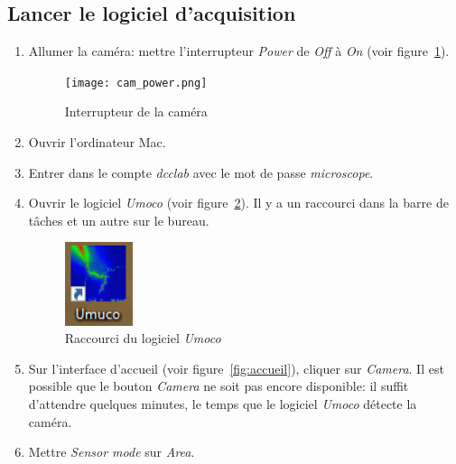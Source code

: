 \subsection{Lancer le logiciel d'acquisition}
\begin{enumerate}
    \item Allumer la caméra: mettre l'interrupteur \textit{Power} de \textit{Off} à \textit{On} (voir figure~\ref{fig:cam_power}).
        \begin{figure}[H]
        \centering
        \texttt{[image: cam\_power.png]}
        \caption{Interrupteur de la caméra}
        \label{fig:cam_power}
        \end{figure}
    \item Ouvrir l'ordinateur Mac.
    \item Entrer dans le compte \textit{dcclab} avec le mot de passe \textit{microscope}.
    \item Ouvrir le logiciel \textit{Umoco} (voir figure~\ref{fig:umoco}). Il y a un raccourci dans la barre de tâches et un autre sur le bureau.
        \begin{figure}[H]
        \centering
        \includegraphics[width=2cm]{umoco.PNG}
        \caption{Raccourci du logiciel \textit{Umoco}}
        \label{fig:umoco}
        \end{figure}
    \item Sur l'interface d'accueil (voir figure~\ref{fig:accueil}), cliquer sur \textit{Camera}. Il est possible que le bouton \textit{Camera} ne soit pas encore disponible: il suffit d'attendre quelques minutes, le temps que le logiciel \textit{Umoco} détecte la caméra.
    \item Mettre \textit{Sensor mode} sur \textit{Area}.
\end{enumerate}